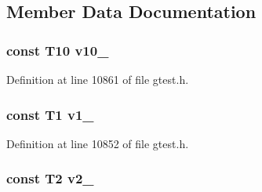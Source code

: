 \subsection{\-Member \-Data \-Documentation}
\hypertarget{classtesting_1_1internal_1_1ValueArray10_a147ca4457ea439b00a93087231ff77ef}{
\subsubsection[{v10\-\_\-}]{\setlength{\rightskip}{0pt plus 5cm}const \-T10 {\bf v10\-\_\-}}}\label{d6/d31/classtesting_1_1internal_1_1ValueArray10_a147ca4457ea439b00a93087231ff77ef}


\-Definition at line 10861 of file gtest.\-h.

\hypertarget{classtesting_1_1internal_1_1ValueArray10_aac1d0654cc6c1aceb4a5d0fa7a98042e}{
\subsubsection[{v1\-\_\-}]{\setlength{\rightskip}{0pt plus 5cm}const \-T1 {\bf v1\-\_\-}}}\label{d6/d31/classtesting_1_1internal_1_1ValueArray10_aac1d0654cc6c1aceb4a5d0fa7a98042e}


\-Definition at line 10852 of file gtest.\-h.

\hypertarget{classtesting_1_1internal_1_1ValueArray10_a9f0a8ce6ce2fd27e980c4c51a7a7256a}{
\subsubsection[{v2\-\_\-}]{\setlength{\rightskip}{0pt plus 5cm}const \-T2 {\bf v2\-\_\-}}}\label{d6/d31/classtesting_1_1internal_1_1ValueArray10_a9f0a8ce6ce2fd27e980c4c51a7a7256a}


